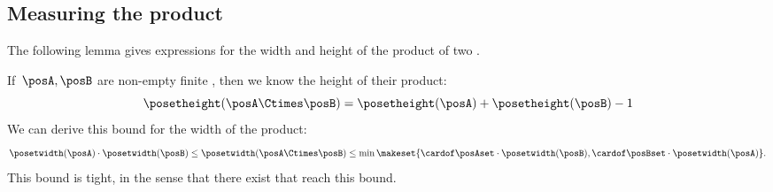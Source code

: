 \subsection{Measuring the product}
The following lemma gives expressions for the width and height of the product of two .

\begin{widepar}
    \begin{lemma}
        \label{lem:measuring-product}
        If~$\posA,\posB$ are non-empty finite , then we know the height of their product:
        \begin{equation}\label{eq:bound-height}
            \posetheight(\posA\Ctimes \posB) = \posetheight(\posA)+\posetheight(\posB)-1
        \end{equation}
        We can derive this bound for the width of the product:
        \begin{equation}\label{eq:bound-width}
            \posetwidth(\posA) \cdot \posetwidth(\posB)
            \leq \posetwidth(\posA\Ctimes \posB)
            \leq \min \makeset{
                \cardof \posAset  \cdot \posetwidth(\posB),\cardof \posBset   \cdot \posetwidth(\posA)
            }.
        \end{equation}
        This bound is tight, in the sense that there exist  that reach this bound.
    \end{lemma}
\end{widepar}


